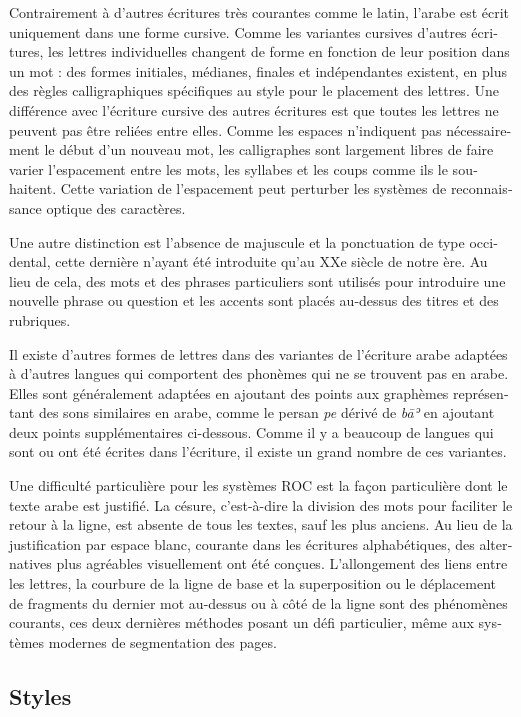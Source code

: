 \begin{french}
Contrairement à d'autres écritures très courantes comme le latin, l'arabe est
écrit uniquement dans une forme cursive. Comme les variantes cursives d'autres
écritures, les lettres individuelles changent de forme en fonction de leur
position dans un mot : des formes initiales, médianes, finales et indépendantes
existent, en plus des règles calligraphiques spécifiques au style pour le
placement des lettres. Une différence avec l'écriture cursive des autres
écritures est que toutes les lettres ne peuvent pas être reliées entre elles.
Comme les espaces n'indiquent pas nécessairement le début d'un nouveau mot, les
calligraphes sont largement libres de faire varier l'espacement entre les mots,
les syllabes et les coups comme ils le souhaitent.  Cette variation de
l'espacement peut perturber les systèmes de reconnaissance optique des
caractères.

Une autre distinction est l'absence de majuscule et la ponctuation de type
occidental, cette dernière n'ayant été introduite qu'au XXe siècle de notre
ère. Au lieu de cela, des mots et des phrases particuliers sont utilisés pour
introduire une nouvelle phrase ou question et les accents sont placés au-dessus
des titres et des rubriques.

Il existe d'autres formes de lettres dans des variantes de l'écriture arabe
adaptées à d'autres langues qui comportent des phonèmes qui ne se trouvent pas
en arabe. Elles sont généralement adaptées en ajoutant des points aux graphèmes
représentant des sons similaires en arabe, comme le persan \emph{pe} dérivé de
\emph{bāʾ} en ajoutant deux points supplémentaires ci-dessous. Comme il y a
beaucoup de langues qui sont ou ont été écrites dans l'écriture, il existe un
grand nombre de ces variantes.

Une difficulté particulière pour les systèmes ROC est la façon particulière
dont le texte arabe est justifié. La césure, c'est-à-dire la division des mots
pour faciliter le retour à la ligne, est absente de tous les textes, sauf les
plus anciens. Au lieu de la justification par espace blanc, courante dans les
écritures alphabétiques, des alternatives plus agréables visuellement ont été
conçues.  L'allongement des liens entre les lettres, la courbure de la ligne de
base et la superposition ou le déplacement de fragments du dernier mot
au-dessus ou à côté de la ligne sont des phénomènes courants, ces deux
dernières méthodes posant un défi particulier, même aux systèmes modernes de
segmentation des pages.

\subsection{Styles}


\end{french}
